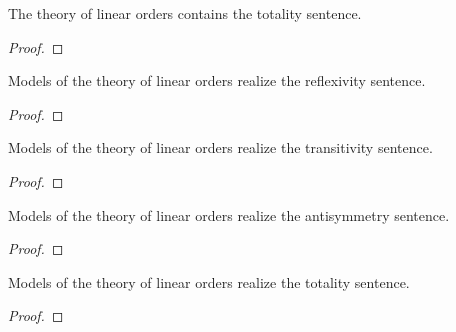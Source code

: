 \begin{lemma}
    \label{lem:total-in-linear-order-theory}
    \leanok
    The theory of linear orders contains the totality sentence.
\end{lemma}
\begin{proof}
    \leanok
\end{proof}

\begin{lemma}
    \label{lem:models-of-linearOrderTheory-realize-reflexive}
    \leanok
    Models of the theory of linear orders realize the reflexivity sentence.
\end{lemma}
\begin{proof}
    \leanok
\end{proof}

\begin{lemma}
    \label{lem:models-of-linearOrderTheory-realize-transitive}
    \leanok
    Models of the theory of linear orders realize the transitivity sentence.
\end{lemma}
\begin{proof}
    \leanok
\end{proof}

\begin{lemma}
    \label{lem:models-of-linearOrderTheory-realize-antisymmetric}
    \leanok
    Models of the theory of linear orders realize the antisymmetry sentence.
\end{lemma}
\begin{proof}
    \leanok
\end{proof}

\begin{lemma}
    \label{lem:models-of-linearOrderTheory-realize-total}
    \leanok
    Models of the theory of linear orders realize the totality sentence.
\end{lemma}
\begin{proof}
    \leanok
\end{proof}

